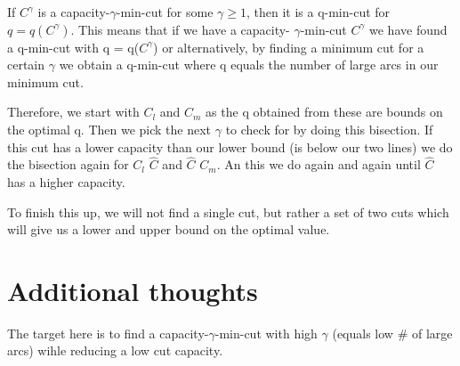 \documentclass{article}
\begin{document}
If $C^\gamma$ is a capacity-$\gamma$-min-cut for some $\gamma \geq 1$, then it is a q-min-cut for $q = q(C^\gamma)$. This means that if we have a capacity-
$\gamma$-min-cut $C^\gamma$ we have found a q-min-cut with q = q($C^\gamma$) or alternatively, by finding a minimum cut for a certain $\gamma$ we obtain a q-min-cut 
where q equals the number of large arcs in our minimum cut. 

Therefore, we start with $C_l$ and $C_m$ as the q obtained from these are bounds on the optimal q. Then we pick the next $\gamma$ to check for by doing this 
bisection. If this cut has a lower capacity than our lower bound (is below our two lines) we do the bisection again for $C_l$ $\hat{C}$ and $\hat{C}$ $C_m$.
An this we do again and again until $\hat{C}$ has a higher capacity. 

To finish this up, we will not find a single cut, but rather a set of two cuts which will give us a lower and upper bound on the optimal value.


\section{Additional thoughts}
The target here is to find a capacity-$\gamma$-min-cut with high $\gamma$ (equals low \# of large arcs) wihle reducing a low cut capacity. 
\end{document}
